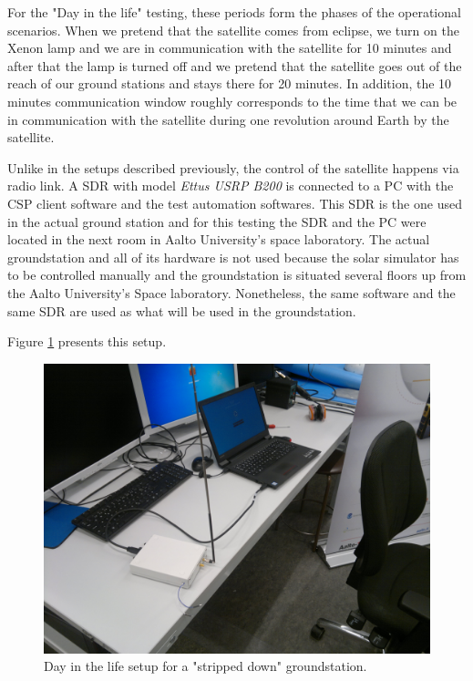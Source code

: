 \documentclass[english,12pt,a4paper,pdftex,elec,utf8]{aaltothesis}
\begin{document}
For the "Day in the life" testing, these periods form the phases of the operational scenarios. When we pretend that the satellite comes from eclipse, we turn on the Xenon lamp and we are in communication with the satellite for 10 minutes and after that the lamp is turned off and we pretend that the satellite goes out of the reach of our ground stations and stays there for 20 minutes. In addition, the 10 minutes communication window roughly corresponds to the time that we can be in communication with the satellite during one revolution around Earth by the satellite.\par 
Unlike in the setups described previously, the control of the satellite happens via radio link. A SDR with model \textit{Ettus USRP B200} is connected to a PC with the CSP client software and the test automation softwares. This SDR is the one used in the actual ground station and for this testing the SDR and the PC were located in the next room in Aalto University's space laboratory. The actual groundstation and all of its hardware is not used because the solar simulator has to be controlled manually and the groundstation is situated several floors up from the Aalto University's Space laboratory. Nonetheless, the same software and the same SDR are used as what will be used in the groundstation.\par 
Figure \ref{dayinlifelink} presents this setup.\par
\begin{figure}[h!]
\centering
\includegraphics[scale=0.3]{daysetuplink}
\caption{Day in the life setup for a "stripped down" groundstation.}
\label{dayinlifelink}
\end{figure} 
\clearpage
\end{document}
